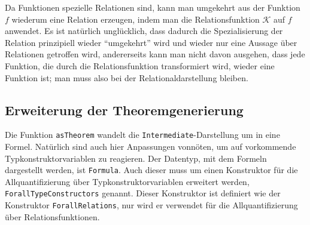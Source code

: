 Da Funktionen spezielle Relationen sind, kann man umgekehrt aus der Funktion $f$ wiederum eine Relation erzeugen, indem
man die Relationsfunktion $\mathcal{K}$ auf $f$ anwendet. Es ist natürlich unglücklich, dass dadurch die Spezialisierung
der Relation prinzipiell wieder ``umgekehrt'' wird und wieder nur eine Aussage über Relationen getroffen wird, andererseits
kann man nicht davon ausgehen, dass jede Funktion, die durch die Relationsfunktion transformiert wird, wieder eine Funktion ist;
man muss also bei der Relationaldarstellung bleiben.





\subsection{Erweiterung der Theoremgenerierung}

Die Funktion \texttt{asTheorem} wandelt die \texttt{Intermediate}-Darstellung um in eine Formel. Natürlich sind auch hier
Anpassungen vonnöten, um auf vorkommende Typkonstruktorvariablen zu reagieren. Der Datentyp, mit dem Formeln
dargestellt werden, ist \texttt{Formula}. Auch dieser muss um einen Konstruktor für die Allquantifizierung über
Typkonstruktorvariablen erweitert werden, \texttt{ForallTypeConstructors} genannt.
Dieser Konstruktor ist definiert wie der Konstruktor \texttt{ForallRelations}, nur wird er verwendet für die Allquantifizierung
über Relationsfunktionen.

